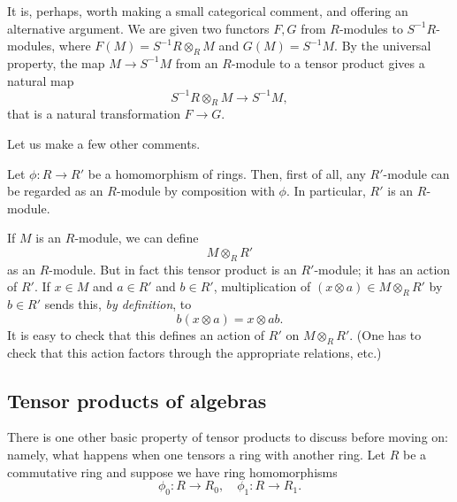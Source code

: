 It is, perhaps, worth making a small categorical comment, and offering an
alternative argument.
We are given two functors $F,G$ from $R$-modules to $S^{-1}R$-modules, where
$F(M) = S^{-1}R \otimes_R M$ and $G(M) = S^{-1}M$.
By the universal property, the map $M \to S^{-1}M$ from an $R$-module to a
tensor product gives  a natural map
\[ S^{-1}R \otimes_R M \to S^{-1}M,  \]
that is a natural transformation $F \to G$.



Let us make a few other comments.

\begin{remark}
Let $\phi: R \to R'$ be a homomorphism of rings. Then, first of all, any
$R'$-module can be regarded as an $R$-module by composition with $\phi$. In
particular, $R'$ is an $R$-module.

If $M$ is an $R$-module, we can define
\[ M \otimes_R R'  \]
as an $R$-module. But in fact this tensor product is an $R'$-module; it has
an action of $R'$.   If $x \in M$ and $a \in R'$ and $b \in R'$, multiplication
of $(x \otimes a) \in M \otimes_R R'$ by $b \in R'$ sends this, \emph{by
definition}, to
\[ b(x \otimes a) = x \otimes ab.  \]
It is easy to check that this defines an action of $R'$ on $M \otimes_R R'$.
(One has to check that this action factors through the appropriate relations,
etc.)

\end{remark}

\subsection{Tensor products of algebras}
There is one other basic property of tensor products to discuss before moving
on: namely, what happens when one tensors a ring with another ring.
Let $R$ be a commutative ring and suppose we have ring homomorphisms
\[ \phi_0: R \to R_0, \quad \phi_1: R \to R_1.	\]

